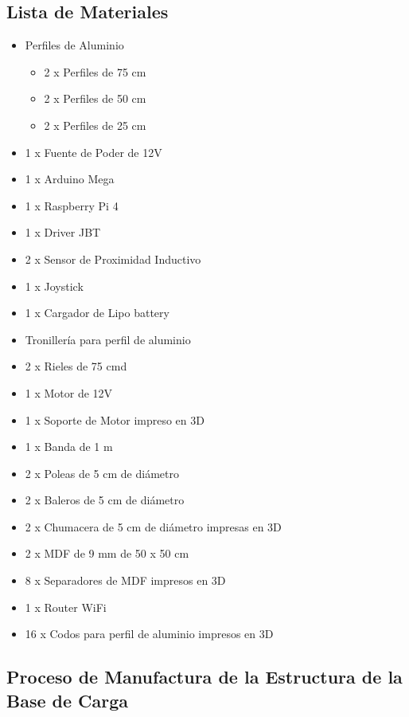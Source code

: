 \subsection{Lista de Materiales}
\begin{itemize}
    \item Perfiles de Aluminio
        \begin{itemize}
            \item 2 x Perfiles de 75 cm
            \item 2 x Perfiles de 50 cm
            \item 2 x Perfiles de 25 cm
        \end{itemize}
    \item 1 x Fuente de Poder de 12V
    \item 1 x Arduino Mega
    \item 1 x Raspberry Pi 4
    \item 1 x Driver JBT 
    \item 2 x Sensor de Proximidad Inductivo
    \item 1 x Joystick
    \item 1 x Cargador de Lipo battery
    \item Tronillería para perfil de aluminio
    \item 2 x Rieles de 75 cmd
    \item 1 x Motor de 12V
    \item 1 x Soporte de Motor impreso en 3D
    \item 1 x Banda de 1 m
    \item 2 x Poleas de 5 cm de diámetro
    \item 2 x Baleros de 5 cm de diámetro
    \item 2 x Chumacera de 5 cm de diámetro impresas en 3D
    \item 2 x MDF de 9 mm de 50 x 50 cm
    \item 8 x Separadores de MDF impresos en 3D
    \item 1 x Router WiFi
    \item 16 x Codos para perfil de aluminio impresos en 3D
\end{itemize}

\subsection{Proceso de Manufactura de la Estructura de la Base de Carga}

